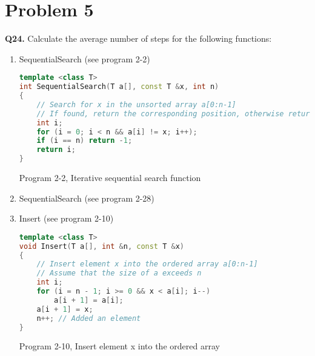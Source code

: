\documentclass{article}
\begin{document}
\section{Problem 5}

\textbf{Q24.}
Calculate the average number of steps for the following functions:
\begin{enumerate}
    \item SequentialSearch (see program 2-2)
          \begin{lstlisting}[language=C++]
template <class T>
int SequentialSearch(T a[], const T &x, int n)
{
    // Search for x in the unsorted array a[0:n-1]
    // If found, return the corresponding position, otherwise return -1
    int i;
    for (i = 0; i < n && a[i] != x; i++);
    if (i == n) return -1;
    return i;
}
\end{lstlisting}
          \begin{center}
              Program 2-2, Iterative sequential search function
          \end{center}
    \item SequentialSearch (see program 2-28)
    \item Insert (see program 2-10)
          \begin{lstlisting}[language=C++]
template <class T>
void Insert(T a[], int &n, const T &x)
{
    // Insert element x into the ordered array a[0:n-1]
    // Assume that the size of a exceeds n
    int i;
    for (i = n - 1; i >= 0 && x < a[i]; i--)
        a[i + 1] = a[i];
    a[i + 1] = x;
    n++; // Added an element
}
\end{lstlisting}
          \begin{center}
              Program 2-10, Insert element x into the ordered array
          \end{center}
\end{enumerate}
\end{document}
